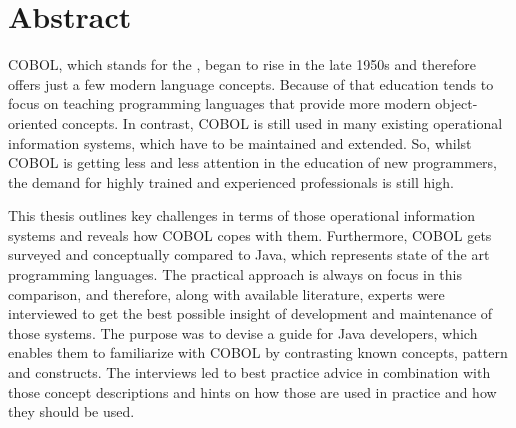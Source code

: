 \chapter*{Abstract} 

COBOL, which stands for the , began to rise in the late 1950s and therefore offers just a few modern language concepts. Because of that education tends to focus on teaching programming languages that provide more modern object-oriented concepts. In contrast, COBOL is still used in many existing operational information systems, which have to be maintained and extended. So, whilst COBOL is getting less and less attention in the education of new programmers, the demand for highly trained and experienced professionals is still high. 

This thesis outlines key challenges in terms of those operational information systems and reveals how COBOL copes with them. Furthermore, COBOL gets surveyed and conceptually compared to Java, which represents state of the art programming languages. The practical approach is always on focus in this comparison, and therefore, along with available literature, experts were interviewed to get the best possible insight of development and maintenance of those systems. The purpose was to devise a guide for Java developers, which enables them to familiarize with COBOL by contrasting known concepts, pattern and constructs. The interviews led to best practice advice in combination with those concept descriptions and hints on how those are used in practice and how they should be used.